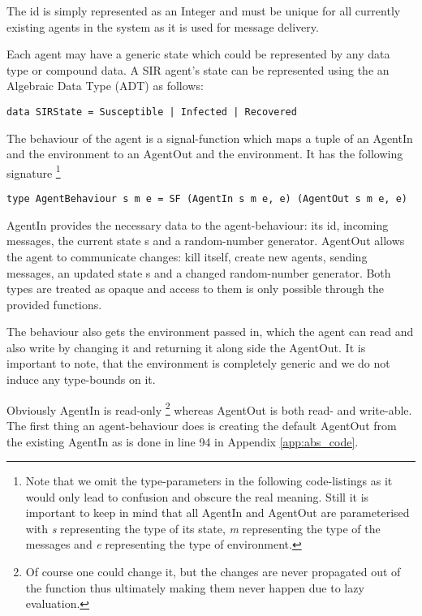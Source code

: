 The id is simply represented as an Integer and must be unique for all currently existing agents in the system as it is used for message delivery. %

Each agent may have a generic state which could be represented by any data type or compound data. A SIR agent's state can be represented using the an Algebraic Data Type (ADT) as follows:
\begin{verbatim}
data SIRState = Susceptible | Infected | Recovered
\end{verbatim}

The behaviour of the agent is a signal-function which maps a tuple of an AgentIn and the environment to an AgentOut and the environment. It has the following signature \footnote{Note that we omit the type-parameters in the following code-listings as it would only lead to confusion and obscure the real meaning. Still it is important to keep in mind that all AgentIn and AgentOut are parameterised with \textit{s} representing the type of its state, \textit{m} representing the type of the messages and \textit{e} representing the type of environment.} 
\begin{verbatim}
type AgentBehaviour s m e = SF (AgentIn s m e, e) (AgentOut s m e, e)
\end{verbatim}

AgentIn provides the necessary data to the agent-behaviour: its id, incoming messages, the current state s and a random-number generator. AgentOut allows the agent to communicate changes: kill itself, create new agents, sending messages, an updated state s and a changed random-number generator. Both types are treated as opaque and access to them is only possible through the provided functions.

The behaviour also gets the environment passed in, which the agent can read and also write by changing it and returning it along side the AgentOut. It is important to note, that the environment is completely generic and we do not induce any type-bounds on it.

Obviously AgentIn is read-only \footnote{Of course one could change it, but the changes are never propagated out of the function thus ultimately making them never happen due to lazy evaluation.} whereas AgentOut is both read- and write-able. The first thing an agent-behaviour does is creating the default AgentOut from the existing AgentIn as is done in line 94 in Appendix \ref{app:abs_code}.

